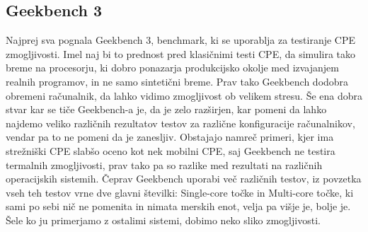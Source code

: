 \subsection{Geekbench 3}
Najprej sva pognala Geekbench 3, benchmark, ki se uporablja za testiranje CPE zmogljivosti. Imel naj bi to prednost pred klasičnimi testi CPE, da simulira tako breme na procesorju, ki dobro ponazarja produkcijsko okolje med izvajanjem realnih programov, in ne samo sintetični breme. Prav tako Geekbench dodobra obremeni računalnik, da lahko vidimo zmogljivost ob velikem stresu. Še ena dobra stvar kar se tiče Geekbench-a je, da je zelo razširjen, kar pomeni da lahko najdemo veliko različnih rezultatov testov za različne konfiguracije računalnikov, vendar pa to ne pomeni da je zanesljiv. Obstajajo namreč primeri, kjer ima strežniški CPE slabšo oceno kot nek mobilni CPE, saj Geekbench ne testira termalnih zmogljivosti, prav tako pa so razlike med rezultati na različnih operacijskih sistemih. Čeprav Geekbench uporabi več različnih testov, iz povzetka vseh teh testov vrne dve glavni številki: Single-core točke in Multi-core točke, ki sami po sebi nič ne pomenita in nimata merskih enot, velja pa višje je, bolje je. Šele ko ju primerjamo z ostalimi sistemi, dobimo neko sliko zmogljivosti. 

